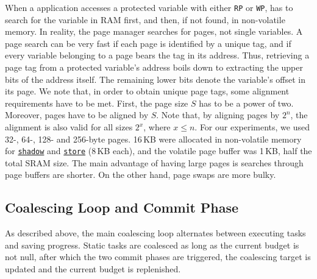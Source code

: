 When a \sys application accesses a protected variable with either \texttt{RP} or \texttt{WP}, \sys has to search for the variable in RAM first, and then, if not found, in non-volatile memory. In reality, the page manager searches for pages, not single variables. A page search can be very fast if each page is identified by a unique tag, and if every variable belonging to a page bears the tag in its address. Thus, retrieving a page tag from a protected variable's address boils down to extracting the upper bits of the address itself. The remaining lower bits denote the variable's offset in its page. 
We note that, in order to obtain unique page tags, some alignment requirements have to be met. First, the page size $S$ has to be a power of two. Moreover, pages have to be aligned by $S$. Note that, by aligning pages by $2^n$, the alignment is also valid for all sizes $2^x$, where $x \leq n$. For our experiments, we used 32-, 64-, 128- and 256-byte pages. 16\,KB were allocated in non-volatile memory for \texttt{\underline{shadow}} and \texttt{\underline{store}} (8\,KB each), and the volatile page buffer was 1\,KB, half the total SRAM size. The main advantage of having large pages is searches through page buffers are shorter. On the other hand, page swaps are more bulky.



\subsection{Coalescing Loop and Commit Phase}

As described above, the main coalescing loop alternates between executing tasks and saving progress. Static tasks are coalesced as long as the current budget is not null, after which the two commit phases are triggered, the coalescing target is updated and the current budget is replenished.


